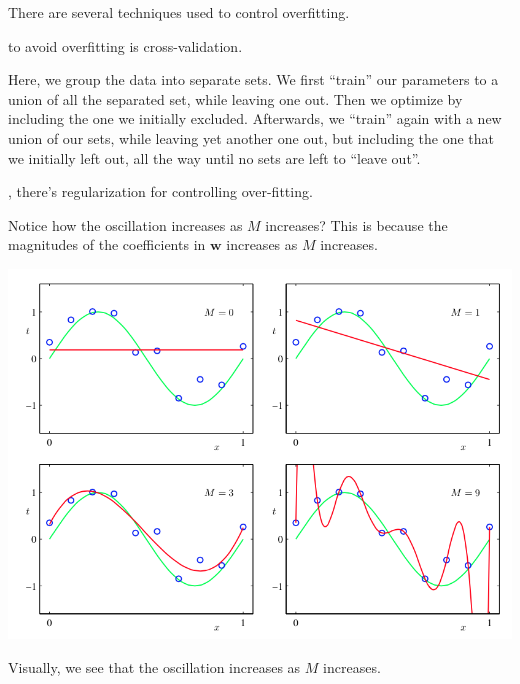 \documentclass{tufte-handout}
\begin{document}
There are several techniques used to control overfitting.

 to avoid overfitting is cross-validation.

Here, we group the data into separate sets. We first ``train'' our parameters to
a union of all the separated set, while leaving one out. Then we optimize by
including the one we initially excluded. Afterwards, we ``train'' again with a
new union of our sets, while leaving yet another one out, but including the one
that we initially left out, all the way until no sets are left to ``leave out''.

, there's regularization for controlling over-fitting.

Notice how the oscillation increases as $M$ increases? This is because the
magnitudes of the coefficients in $\mathbf{w}$ increases as $M$ increases.

\begin{marginfigure}
  \includegraphics[width=\linewidth]{oscillations.png}
  \caption{Visually, we see that the oscillation increases as $M$ increases.}
\end{marginfigure}
\end{document}

